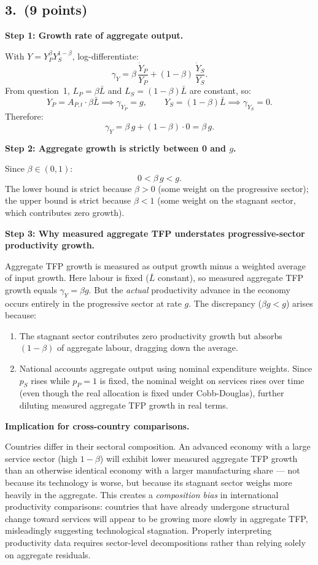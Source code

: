 \documentclass[a4paper,11pt]{article}
\begin{document}
\subsection*{3.\ (9 points)}

\begin{answerbox}
\textbf{Step 1: Growth rate of aggregate output.}

With $Y = Y_P^{\beta} Y_S^{1-\beta}$, log-differentiate:
\[
    \gamma_Y = \beta\,\frac{\dot{Y}_P}{Y_P} + (1-\beta)\,\frac{\dot{Y}_S}{Y_S}.
\]
From question~1, $L_P = \beta\bar{L}$ and $L_S = (1-\beta)\bar{L}$ are constant, so:
\[
    Y_P = A_{P,t}\cdot\beta\bar{L} \implies \gamma_{Y_P} = g,
    \qquad Y_S = (1-\beta)\bar{L} \implies \gamma_{Y_S} = 0.
\]
Therefore:
\[
    \boxed{\gamma_Y = \beta\,g + (1-\beta)\cdot 0 = \beta\,g.}
\]

\textbf{Step 2: Aggregate growth is strictly between 0 and $g$.}

Since $\beta \in (0,1)$:
\[
    0 < \beta\,g < g.
\]
The lower bound is strict because $\beta > 0$ (some weight on the progressive sector); the upper bound is strict because $\beta < 1$ (some weight on the stagnant sector, which contributes zero growth).

\textbf{Step 3: Why measured aggregate TFP understates progressive-sector productivity growth.}

Aggregate TFP growth is measured as output growth minus a weighted average of input growth.  Here labour is fixed ($\bar{L}$ constant), so measured aggregate TFP growth equals $\gamma_Y = \beta g$.  But the \emph{actual} productivity advance in the economy occurs entirely in the progressive sector at rate $g$.  The discrepancy ($\beta g < g$) arises because:
\begin{enumerate}[label=(\roman*), itemsep=3pt]
    \item The stagnant sector contributes zero productivity growth but absorbs $(1-\beta)$ of aggregate labour, dragging down the average.
    \item National accounts aggregate output using nominal expenditure weights.  Since $p_S$ rises while $p_P = 1$ is fixed, the nominal weight on services rises over time (even though the real allocation is fixed under Cobb-Douglas), further diluting measured aggregate TFP growth in real terms.
\end{enumerate}

\textbf{Implication for cross-country comparisons.}

Countries differ in their sectoral composition.  An advanced economy with a large service sector (high $1-\beta$) will exhibit lower measured aggregate TFP growth than an otherwise identical economy with a larger manufacturing share --- not because its technology is worse, but because its stagnant sector weighs more heavily in the aggregate.  This creates a \emph{composition bias} in international productivity comparisons: countries that have already undergone structural change toward services will appear to be growing more slowly in aggregate TFP, misleadingly suggesting technological stagnation.  Properly interpreting productivity data requires sector-level decompositions rather than relying solely on aggregate residuals.
\end{answerbox}
\end{document}
